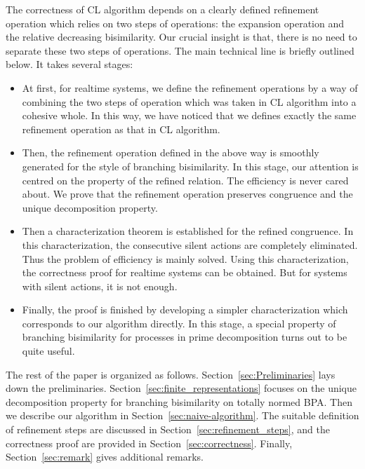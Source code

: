 \documentclass{llncs}
\begin{document}
The correctness of CL algorithm depends on a clearly defined refinement operation which relies on two steps of operations: the expansion operation and the relative decreasing bisimilarity.  Our crucial insight is that, there is no need to separate these two steps of operations.    The main technical line is briefly outlined below.  It takes several stages:
\begin{itemize}
\item
 At first, for realtime systems, we define  the refinement operations by a way of combining the two steps of operation which was taken in CL algorithm into a cohesive whole.  In this way, we have noticed that we defines exactly the same refinement operation as that in CL algorithm.



\item
Then,
the refinement operation defined in the above way  is smoothly generated for the style of branching bisimilarity. In this stage, our attention is centred on the property of the refined relation. The efficiency is never cared about.  We prove that the refinement operation preserves  congruence and the unique decomposition property.

\item
Then a characterization theorem is established for the refined congruence.  In this characterization, the consecutive silent actions are completely eliminated. Thus the problem of efficiency is mainly solved. Using this characterization, the correctness proof for realtime systems can be obtained.  But for systems with silent actions, it is not enough.


\item
Finally, the proof is finished by developing a simpler characterization  which corresponds to our algorithm directly. In this stage,  a special property of branching bisimilarity for processes in prime decomposition turns out to be quite useful.
\end{itemize}

The rest of the paper is organized as follows. Section~\ref{sec:Preliminaries} lays down the preliminaries. Section~\ref{sec:finite_representations} focuses on the unique decomposition property for branching bisimilarity on totally normed BPA. Then we describe our algorithm in Section~\ref{sec:naive-algorithm}. The suitable definition of refinement steps are discussed in Section~\ref{sec:refinement_steps},  and the correctness proof are provided in Section~\ref{sec:correctness}.  Finally, Section~\ref{sec:remark} gives additional remarks.
\end{document}
